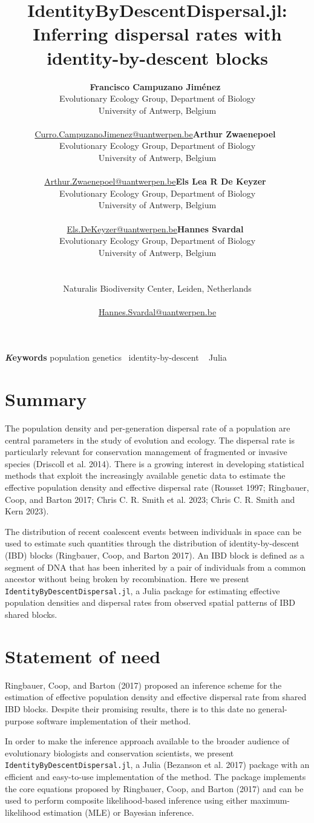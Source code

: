 \documentclass[
]{article}
\title{IdentityByDescentDispersal.jl: Inferring dispersal rates with
identity-by-descent blocks}
\author{\textbf{Francisco Campuzano
Jiménez}~\orcidlink{0000-0001-8285-9318}\\Evolutionary Ecology Group,
Department of Biology\\University of Antwerp,
Belgium\\\\\href{mailto:Curro.CampuzanoJimenez@uantwerpen.be}{Curro.CampuzanoJimenez@uantwerpen.be}\asep\textbf{Arthur
Zwaenepoel}~\orcidlink{0000-0003-1085-2912}\\Evolutionary Ecology Group,
Department of Biology\\University of Antwerp,
Belgium\\\\\href{mailto:Arthur.Zwaenepoel@uantwerpen.be}{Arthur.Zwaenepoel@uantwerpen.be}\asep\textbf{Els
Lea R De Keyzer}~\orcidlink{0000-0003-0924-0118}\\Evolutionary Ecology
Group, Department of Biology\\University of Antwerp,
Belgium\\\\\href{mailto:Els.DeKeyzer@uantwerpen.be}{Els.DeKeyzer@uantwerpen.be}\asep\textbf{Hannes
Svardal}~\orcidlink{0000-0001-7866-7313}\\Evolutionary Ecology Group,
Department of Biology\\University of Antwerp, Belgium\\\\\\Naturalis
Biodiversity Center, Leiden,
Netherlands\\\\\href{mailto:Hannes.Svardal@uantwerpen.be}{Hannes.Svardal@uantwerpen.be}}
\date{}
\begin{document}
\maketitle
{\bfseries \emph Keywords}
\def\sep{\textbullet\ }
population genetics \sep identity-by-descent \sep
Julia



\section{Summary}\label{summary}

The population density and per-generation dispersal rate of a population
are central parameters in the study of evolution and ecology. The
dispersal rate is particularly relevant for conservation management of
fragmented or invasive species (Driscoll et al. 2014). There is a
growing interest in developing statistical methods that exploit the
increasingly available genetic data to estimate the effective population
density and effective dispersal rate (Rousset 1997; Ringbauer, Coop, and
Barton 2017; Chris C. R. Smith et al. 2023; Chris C. R. Smith and Kern
2023).

The distribution of recent coalescent events between individuals in
space can be used to estimate such quantities through the distribution
of identity-by-descent (IBD) blocks (Ringbauer, Coop, and Barton 2017).
An IBD block is defined as a segment of DNA that has been inherited by a
pair of individuals from a common ancestor without being broken by
recombination. Here we present \texttt{IdentityByDescentDispersal.jl}, a
Julia package for estimating effective population densities and
dispersal rates from observed spatial patterns of IBD shared blocks.

\section{Statement of need}\label{sec-statement-of-need}

Ringbauer, Coop, and Barton (2017) proposed an inference scheme for the
estimation of effective population density and effective dispersal rate
from shared IBD blocks. Despite their promising results, there is to
this date no general-purpose software implementation of their method.

In order to make the inference approach available to the broader
audience of evolutionary biologists and conservation scientists, we
present \texttt{IdentityByDescentDispersal.jl}, a Julia (Bezanson et al.
2017) package with an efficient and easy-to-use implementation of the
method. The package implements the core equations proposed by Ringbauer,
Coop, and Barton (2017) and can be used to perform composite
likelihood-based inference using either maximum-likelihood estimation
(MLE) or Bayesian inference.
\end{document}
